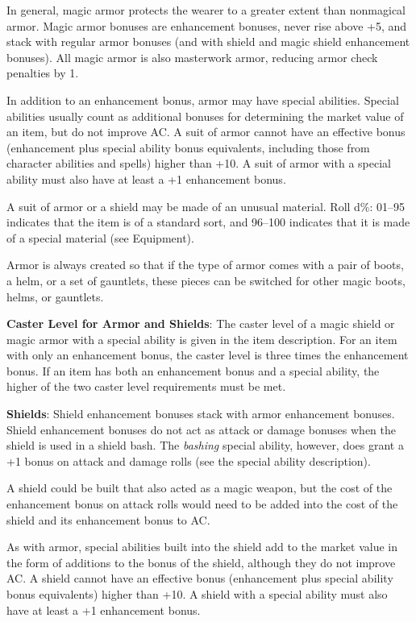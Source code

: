 In general, magic armor protects the wearer to a greater extent than nonmagical armor. Magic armor bonuses are enhancement bonuses, never rise above +5, and stack with regular armor bonuses (and with shield and magic shield enhancement bonuses). All magic armor is also masterwork armor, reducing armor check penalties by 1.
				
In addition to an enhancement bonus, armor may have special abilities. Special abilities usually count as additional bonuses for determining the market value of an item, but do not improve AC. A suit of armor cannot have an effective bonus (enhancement plus special ability bonus equivalents, including those from character abilities and spells) higher than +10. A suit of armor with a special ability must also have at least a +1 enhancement bonus.
				
A suit of armor or a shield may be made of an unusual material. Roll d\%: 01--95 indicates that the item is of a standard sort, and 96--100 indicates that it is made of a special material (see Equipment).
				
Armor is always created so that if the type of armor comes with a pair of boots, a helm, or a set of gauntlets, these pieces can be switched for other magic boots, helms, or gauntlets.
				
\textbf{Caster Level for Armor and Shields}: The caster level of a magic shield or magic armor with a special ability is given in the item description. For an item with only an enhancement bonus, the caster level is three times the enhancement bonus. If an item has both an enhancement bonus and a special ability, the higher of the two caster level requirements must be met.
				
\textbf{Shields}: Shield enhancement bonuses stack with armor enhancement bonuses. Shield enhancement bonuses do not act as attack or damage bonuses when the shield is used in a shield bash. The \textit{bashing} special ability, however, does grant a +1 bonus on attack and damage rolls (see the special ability description).
				
A shield could be built that also acted as a magic weapon, but the cost of the enhancement bonus on attack rolls would need to be added into the cost of the shield and its enhancement bonus to AC.
				
As with armor, special abilities built into the shield add to the market value in the form of additions to the bonus of the shield, although they do not improve AC. A shield cannot have an effective bonus (enhancement plus special ability bonus equivalents) higher than +10. A shield with a special ability must also have at least a +1 enhancement bonus.
				
